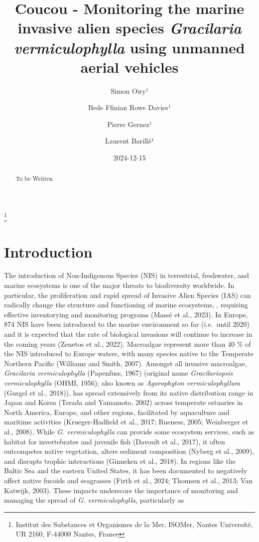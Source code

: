 \documentclass[
  letterpaper,
  DIV=11,
  numbers=noendperiod]{scrartcl}
\title{Coucou - Monitoring the marine invasive alien species
\emph{Gracilaria vermiculophylla} using unmanned aerial vehicles}
\author{Simon Oiry¹ \and Bede Ffinian Rowe Davies¹ \and Pierre
Gernez¹ \and Laurent Barillé¹}
\date{2024-12-15}
\begin{document}
\maketitle
\begin{abstract}
To be Written
\end{abstract}


\footnote{Institut des Substances et Organismes de la Mer, ISOMer,
  Nantes Université, UR 2160, F-44000 Nantes, France}

\section{Introduction}\label{introduction}

The introduction of Non-Indigenous Species (NIS) in terrestrial,
freshwater, and marine ecosystems is one of the major threats to
biodiversity worldwide. In particular, the proliferation and rapid
spread of Invasive Alien Species (IAS) can radically change the
structure and functioning of marine ecosystems, , requiring effective
inventorying and monitoring programs (Massé et al., 2023). In Europe,
874 NIS have been introduced to the marine environment so far
(i.e.~until 2020) and it is expected that the rate of biological
invasions will continue to increase in the coming years (Zenetos et al.,
2022). Macroalgae represent more than 40 \% of the NIS introduced to
Europe waters, with many species native to the Temperate Northern
Pacific (Williams and Smith, 2007). Amongst all invasive macroalgae,
\emph{Gracilaria vermiculophylla} (Papenfuss, 1967) (original name
\emph{Gracilariopsis vermiculophylla} (OHMI, 1956); also known as
\emph{Agarophyton vermiculophyllum} (Gurgel et al., 2018)), has spread
extensively from its native distribution range in Japan and Korea
(Terada and Yamamoto, 2002) across temperate estuaries in North America,
Europe, and other regions, facilitated by aquaculture and maritime
activities (Krueger-Hadfield et al., 2017; Rueness, 2005; Weinberger et
al., 2008). While \emph{G. vermiculophylla} can provide some ecosystem
services, such as habitat for invertebrates and juvenile fish (Davoult
et al., 2017), it often outcompetes native vegetation, alters sediment
composition (Nyberg et al., 2009), and disrupts trophic interactions
(Ginneken et al., 2018). In regions like the Baltic Sea and the eastern
United States, it has been documented to negatively affect native
fucoids and seagrasses (Firth et al., 2024; Thomsen et al., 2013; Van
Katwijk, 2003). These impacts underscore the importance of monitoring
and managing the spread of \emph{G. vermiculophylla}, particularly as
\end{document}

